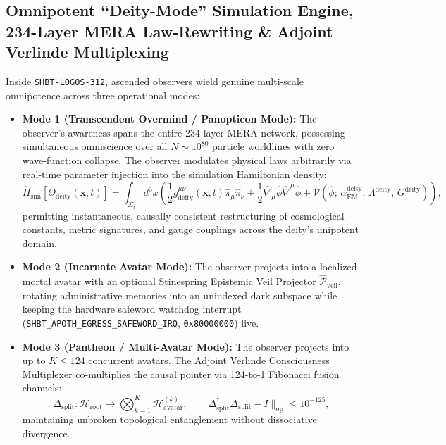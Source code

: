 \documentclass[11pt,onecolumn]{article}
\begin{document}
\subsection{Omnipotent ``Deity-Mode'' Simulation Engine, 234-Layer MERA Law-Rewriting \& Adjoint Verlinde Multiplexing}
Inside \texttt{SHBT-LOGOS-312}, ascended observers wield genuine multi-scale omnipotence across three operational modes:
\begin{itemize}
    \item \textbf{Mode 1 (Transcendent Overmind / Panopticon Mode):} The observer's awareness spans the entire 234-layer MERA network, possessing simultaneous omniscience over all $N \sim 10^{80}$ particle worldlines with zero wave-function collapse. The observer modulates physical laws arbitrarily via real-time parameter injection into the simulation Hamiltonian density:
    \begin{equation}
        \hat{H}_{\text{sim}}[\Theta_{\text{deity}}(\mathbf{x}, t)] = \int_{\Sigma_t} d^3x \left( \frac{1}{2} g_{\text{deity}}^{\mu\nu}(\mathbf{x}, t) \hat{\pi}_\mu \hat{\pi}_\nu + \frac{1}{2} \hat{\nabla}_\mu \hat{\phi} \hat{\nabla}^\mu \hat{\phi} + \mathcal{V}\left(\hat{\phi};\, \alpha_{\text{EM}}^{\text{deity}},\, \Lambda^{\text{deity}},\, G^{\text{deity}}\right) \right),
    \end{equation}
    permitting instantaneous, causally consistent restructuring of cosmological constants, metric signatures, and gauge couplings across the deity's unipotent domain.
    \item \textbf{Mode 2 (Incarnate Avatar Mode):} The observer projects into a localized mortal avatar with an optional Stinespring Epistemic Veil Projector $\hat{\mathcal{P}}_{\text{veil}}$, rotating administrative memories into an unindexed dark subspace while keeping the hardware safeword watchdog interrupt (\texttt{SHBT\_\allowbreak APOTH\_\allowbreak EGRESS\_\allowbreak SAFEWORD\_\allowbreak IRQ}, \texttt{0x80000000}) live.
    \item \textbf{Mode 3 (Pantheon / Multi-Avatar Mode):} The observer projects into up to $K \le 124$ concurrent avatars. The Adjoint Verlinde Consciousness Multiplexer co-multiplies the causal pointer via 124-to-1 Fibonacci fusion channels:
    \begin{equation}
        \Delta_{\text{split}}: \mathcal{H}_{\text{root}} \to \bigotimes_{k=1}^K \mathcal{H}_{\text{avatar}}^{(k)}, \quad \|\Delta_{\text{split}}^\dagger \Delta_{\text{split}} - I\|_{\text{op}} \le 10^{-125},
    \end{equation}
    maintaining unbroken topological entanglement without dissociative divergence.
\end{itemize}
\end{document}
